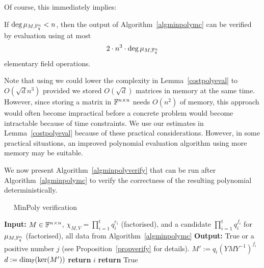 \smallskip
Of course, this immediately implies:

\begin{Cor}
If\/ $\deg \mu_{M,\mathbb{F}_q^n} < n$, then the output of Algorithm~\ref{algminpolymc} 
can be verified by evaluation using at most 
\[ 2\cdot n^3 \cdot \deg \mu_{M,\mathbb{F}_q^n} \] 
elementary field operations.
\end{Cor}

\begin{Rem}
Note that using \cite[Theorem 2]{AC97} we could lower the complexity
in Lemma~\ref{costpolyeval} to $O(\sqrt d n^3)$ provided we 
stored $O(\sqrt d)$ matrices in memory at the same time. However, since
storing a matrix in $\mathbb{F}^{n \times n}$ needs $O(n^2)$ of memory, this
approach would often become impractical before  a
concrete problem would become intractable because of time constraints. 
We use our estimates in Lemma~\ref{costpolyeval} because of
these practical considerations.
However, in some practical situations, an improved polynomial evaluation
algorithm using more memory may be suitable.
\end{Rem}

We now present Algorithm~\ref{algminpolyverify} that can be run after
Algorithm~\ref{algminpolymc} to verify the correctness of the resulting polynomial
deterministically.

\begin{algorithm}
\caption{$\quad$ \sc MinPoly verification}
\label{algminpolyverify}
%
\begin{algorithmic}
\STATE \textbf{Input:} $M \in \mathbb{F}^{n \times n}$, $\chi_{M,V} = \prod_{i=1}^t q_i^{e_i}$ (factorised), 
and a candidate $\prod_{i=1}^t q_i^{f_i}$ for $\mu_{M,\mathbb{F}_q^n}$ (factorised),
all data from Algorithm~\ref{algminpolymc}
\STATE \textbf{Output:} {\sc True} or a positive number $j$ (see
Proposition~\ref{propverify} for details).
\vspace*{2mm}
        \STATE $M' := q_i(YMY^{-1})^{f_i}$
        \STATE $d := \dim_{\mathbb{F}}( \ker(M') )$
            \STATE \textbf{return} $i$
        \ENDIF
    \ENDIF
\ENDFOR
\STATE \textbf{return} {\sc True}
\end{algorithmic}
\end{algorithm}


